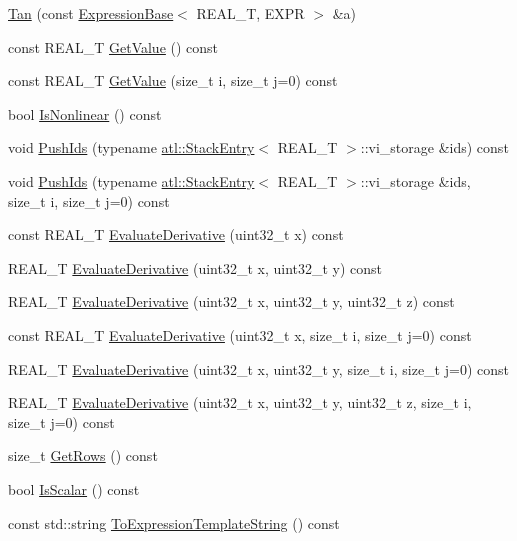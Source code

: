 \begin{DoxyCompactItemize}
\item 
\hyperlink{structatl_1_1_tan_a009437f9412022ee861a1d36d743ae9d}{Tan} (const \hyperlink{structatl_1_1_expression_base}{Expression\+Base}$<$ R\+E\+A\+L\+\_\+\+T, E\+X\+P\+R $>$ \&a)
\item 
const R\+E\+A\+L\+\_\+\+T \hyperlink{structatl_1_1_tan_a61807403c56e8851e8c298f88b94d3be}{Get\+Value} () const 
\item 
const R\+E\+A\+L\+\_\+\+T \hyperlink{structatl_1_1_tan_a1e1762090976901dc6e79199ed43b309}{Get\+Value} (size\+\_\+t i, size\+\_\+t j=0) const 
\item 
bool \hyperlink{structatl_1_1_tan_afc63c20f11dcd082c28a4853ee0ff93d}{Is\+Nonlinear} () const 
\item 
void \hyperlink{structatl_1_1_tan_ad4ca7f38ff57eda3d9163cb2bfd6daf3}{Push\+Ids} (typename \hyperlink{structatl_1_1_stack_entry}{atl\+::\+Stack\+Entry}$<$ R\+E\+A\+L\+\_\+\+T $>$\+::vi\+\_\+storage \&ids) const 
\item 
void \hyperlink{structatl_1_1_tan_a39bf4856c2b171188160f0bf7755d6ac}{Push\+Ids} (typename \hyperlink{structatl_1_1_stack_entry}{atl\+::\+Stack\+Entry}$<$ R\+E\+A\+L\+\_\+\+T $>$\+::vi\+\_\+storage \&ids, size\+\_\+t i, size\+\_\+t j=0) const 
\item 
const R\+E\+A\+L\+\_\+\+T \hyperlink{structatl_1_1_tan_a2773b738ef0a49ce8af313d1260ebb0a}{Evaluate\+Derivative} (uint32\+\_\+t x) const 
\item 
R\+E\+A\+L\+\_\+\+T \hyperlink{structatl_1_1_tan_a457928d68b6dc7d094e5ed484cc47314}{Evaluate\+Derivative} (uint32\+\_\+t x, uint32\+\_\+t y) const 
\item 
R\+E\+A\+L\+\_\+\+T \hyperlink{structatl_1_1_tan_a0ae8d9af53301a2dc999eddb8babe4cf}{Evaluate\+Derivative} (uint32\+\_\+t x, uint32\+\_\+t y, uint32\+\_\+t z) const 
\item 
const R\+E\+A\+L\+\_\+\+T \hyperlink{structatl_1_1_tan_ab96cd11584bad63bc3be780b58be322e}{Evaluate\+Derivative} (uint32\+\_\+t x, size\+\_\+t i, size\+\_\+t j=0) const 
\item 
R\+E\+A\+L\+\_\+\+T \hyperlink{structatl_1_1_tan_a279379e37e209a195cb4315aef058e2d}{Evaluate\+Derivative} (uint32\+\_\+t x, uint32\+\_\+t y, size\+\_\+t i, size\+\_\+t j=0) const 
\item 
R\+E\+A\+L\+\_\+\+T \hyperlink{structatl_1_1_tan_af3f38cfb01a434afadeecca5d0d4685d}{Evaluate\+Derivative} (uint32\+\_\+t x, uint32\+\_\+t y, uint32\+\_\+t z, size\+\_\+t i, size\+\_\+t j=0) const 
\item 
size\+\_\+t \hyperlink{structatl_1_1_tan_af55debb4bef345ff90821580a691c8de}{Get\+Rows} () const 
\item 
bool \hyperlink{structatl_1_1_tan_a5fba4c8f46d15a3245ed0b7144769e3a}{Is\+Scalar} () const 
\item 
const std\+::string \hyperlink{structatl_1_1_tan_ac956411d6146ff0e88ae8dfe6c143b97}{To\+Expression\+Template\+String} () const 
\end{DoxyCompactItemize}
